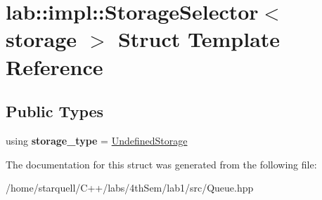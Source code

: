 \hypertarget{structlab_1_1impl_1_1StorageSelector}{}\section{lab\+:\+:impl\+:\+:Storage\+Selector$<$ storage $>$ Struct Template Reference}
\label{structlab_1_1impl_1_1StorageSelector}
\subsection*{Public Types}
\begin{DoxyCompactItemize}
\item 
\mbox{\label{structlab_1_1impl_1_1StorageSelector_ad8ace3a7105ad30f2ea40798b2d56934}} 
using {\bfseries storage\+\_\+type} = \hyperlink{classlab_1_1impl_1_1UndefinedStorage}{Undefined\+Storage}
\end{DoxyCompactItemize}


The documentation for this struct was generated from the following file\+:\begin{DoxyCompactItemize}
\item 
/home/starquell/\+C++/labs/4th\+Sem/lab1/src/Queue.\+hpp\end{DoxyCompactItemize}
